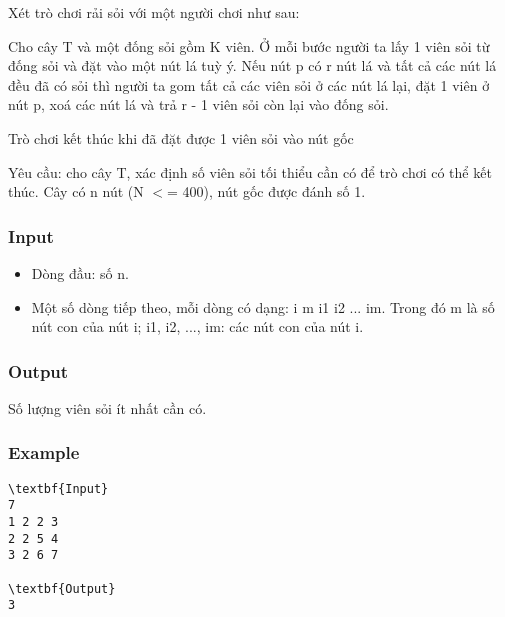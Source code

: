 

Xét trò chơi rải sỏi với một người chơi như sau:

Cho cây T và một đống sỏi gồm K viên. Ở mỗi bước người ta lấy 1 viên sỏi từ đống sỏi và đặt vào một nút lá tuỳ ý. Nếu nút p có r nút lá và tất cả các nút lá đều đã có sỏi thì người ta gom tất cả các viên sỏi ở các nút lá lại, đặt 1 viên ở nút p, xoá các nút lá và trả r - 1 viên sỏi còn lại vào đống sỏi.

Trò chơi kết thúc khi đã đặt được 1 viên sỏi vào nút gốc

Yêu cầu: cho cây T, xác định số viên sỏi tối thiểu cần có để trò chơi có thể kết thúc. Cây có n nút (N $<$= 400), nút gốc được đánh số 1.

\subsubsection{Input}
\begin{itemize}
	\item Dòng đầu: số n.
	\item Một số dòng tiếp theo, mỗi dòng có dạng: i m i1 i2 ... im. Trong đó m là số nút con của nút i; i1, i2, ..., im: các nút con của nút i.
\end{itemize}

\subsubsection{Output}

Số lượng viên sỏi ít nhất cần có.

\subsubsection{Example}
\begin{verbatim}
\textbf{Input}
7
1 2 2 3
2 2 5 4
3 2 6 7

\textbf{Output}
3
\end{verbatim}